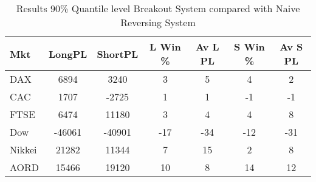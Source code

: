 \begin{table}[ht]
\centering
\caption[Daily 90\% Quantile level Breakout System compared with Naive Reversing System]{Results 90\% Quantile level Breakout System compared with Naive Reversing System} 
\label{tab:chp_ta_90q_diff}
\begin{tabular}{lcccccc}
  \toprule Mkt & LongPL & ShortPL & L Win \% & Av L PL & S Win \% & Av S PL \\ 
  \midrule DAX & 6894 & 3240 & 3 & 5 & 4 & 2 \\ 
  CAC & 1707 & -2725 & 1 & 1 & -1 & -1 \\ 
  FTSE & 6474 & 11180 & 3 & 4 & 4 & 8 \\ 
  Dow & -46061 & -40901 & -17 & -34 & -12 & -31 \\ 
  Nikkei & 21282 & 11344 & 7 & 15 & 2 & 8 \\ 
  AORD & 15466 & 19120 & 10 & 8 & 14 & 12 \\ 
   \bottomrule \end{tabular}
\end{table}

